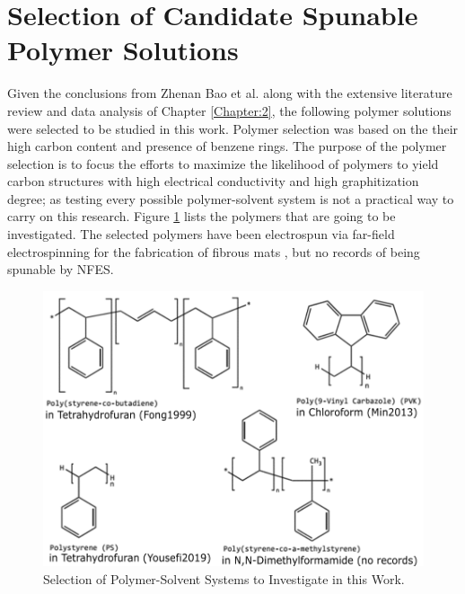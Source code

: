 \section{Selection of Candidate Spunable Polymer Solutions}
Given the conclusions from Zhenan Bao et al. \cite{Liu2015a} along with the extensive literature review and data analysis of Chapter \ref{Chapter:2}, the following polymer solutions were selected to be studied in this work. Polymer selection was based on the their high carbon content and presence of benzene rings. The purpose of the polymer selection is to focus the efforts to maximize the likelihood of polymers to yield carbon structures with high electrical conductivity and high graphitization degree; as testing every possible polymer-solvent system is not a practical way to carry on this research. Figure \ref{fig:selectedpolymers} lists the polymers that are going to be investigated. The selected polymers have been electrospun via far-field electrospinning for the fabrication of fibrous mats \cite{Fong1999, Min2013, Yousefi2019}, but no records of being spunable by NFES. 




\begin{figure}[!th]
\centering
\includegraphics[scale=0.55]{./Figures/selectedpolymers.png}
\decoRule
\caption[Selection of Polymer-Solvent Systems to Investigate in this Work]{Selection of Polymer-Solvent Systems to Investigate in this Work. \cite{Fong1999, Min2013, Yousefi2019}}
\label{fig:selectedpolymers}
\end{figure}

